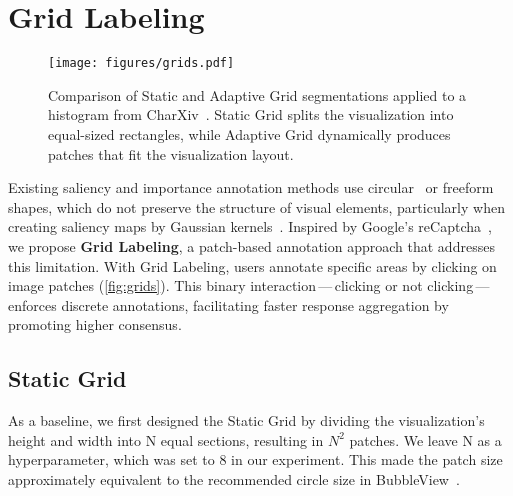 

\section{Grid Labeling}
\begin{figure}[t]
    \centering
    \texttt{[image: figures/grids.pdf]}
    \caption{Comparison of Static and Adaptive Grid segmentations applied to a histogram from CharXiv~\cite{charxiv}. Static Grid splits the visualization into equal-sized rectangles, while Adaptive Grid dynamically produces patches that fit the visualization layout.}
    \label{fig:grids}
    \vspace{-5mm}
\end{figure}
Existing saliency and importance annotation methods use circular~\cite{bubbleView} or freeform~\cite{importAnnot} shapes, which do not preserve the structure of visual elements, particularly when creating saliency maps by Gaussian kernels~\cite{scanpath}.
Inspired by Google's reCaptcha~\cite{recaptcha}, we propose \textbf{Grid Labeling}, a patch-based annotation approach that addresses this limitation. With Grid Labeling, users annotate specific areas by clicking on image patches (\autoref{fig:grids}). This binary interaction\,---\,clicking or not clicking\,---\,enforces discrete annotations, facilitating faster response aggregation by promoting higher consensus. 

\subsection{Static Grid} \label{grids:static}
As a baseline, we first designed the Static Grid by dividing the visualization’s height and width into N equal sections, resulting in $N^2$ patches. We leave N as a hyperparameter, which was set to 8 in our experiment. This made the patch size approximately equivalent to the recommended circle size in BubbleView~\cite{bubbleView}. 

